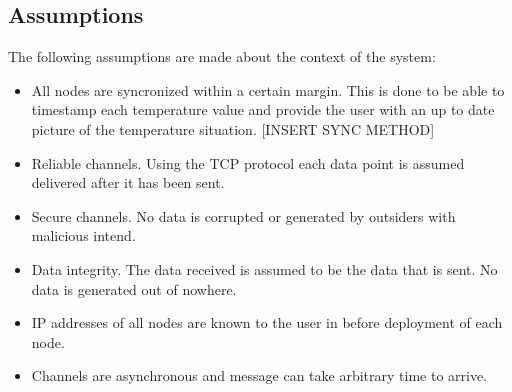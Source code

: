 \subsection{Assumptions}
\label{subsec:assumptions}
The following assumptions are made about the context of the system:
\begin{itemize}
    \item All nodes are syncronized within a certain margin. This is done to be able to timestamp each temperature value and provide the user with an up to date picture of the temperature situation. [INSERT SYNC METHOD]
    \item Reliable channels. Using the TCP protocol each data point is assumed delivered after it has been sent. %
    \item Secure channels. No data is corrupted or generated by outsiders with malicious intend.
    \item Data integrity. The data received is assumed to be the data that is sent. No data is generated out of nowhere.
    \item IP addresses of all nodes are known to the user in before deployment of each node.
    \item Channels are asynchronous and message can take arbitrary time to arrive.
\end{itemize}
